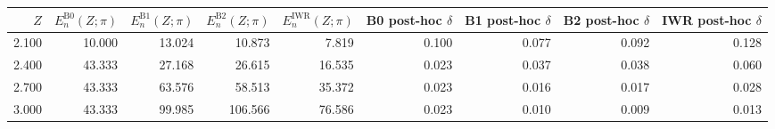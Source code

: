 \begin{tabular}{rrrrrrrrr}
\toprule
$Z$ & $E_n^{\text{B0}}(Z; \pi)$ & $E_n^{\text{B1}}(Z; \pi)$ & $E_n^{\text{B2}}(Z; \pi)$ & $E_n^{\text{IWR}}(Z; \pi)$ & B0 post-hoc $\delta$ & B1 post-hoc $\delta$ & B2 post-hoc $\delta$ & IWR post-hoc $\delta$ \\
\midrule
2.100 & 10.000 & 13.024 & 10.873 & 7.819 & 0.100 & 0.077 & 0.092 & 0.128 \\
2.400 & 43.333 & 27.168 & 26.615 & 16.535 & 0.023 & 0.037 & 0.038 & 0.060 \\
2.700 & 43.333 & 63.576 & 58.513 & 35.372 & 0.023 & 0.016 & 0.017 & 0.028 \\
3.000 & 43.333 & 99.985 & 106.566 & 76.586 & 0.023 & 0.010 & 0.009 & 0.013 \\
\bottomrule
\end{tabular}
